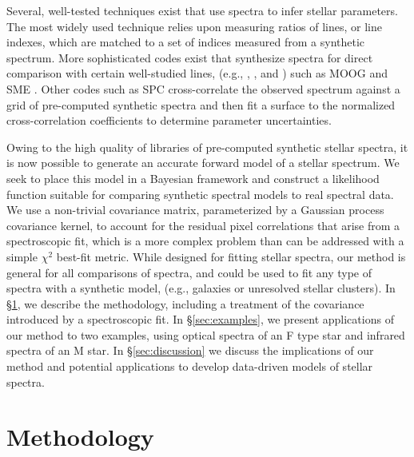 \documentclass[iop,floatfix]{emulateapj}
\begin{document}
Several, well-tested techniques exist that use spectra to infer stellar parameters. The most widely used technique relies upon measuring ratios of lines, or line indexes, which are matched to a set of indices measured from a synthetic spectrum. More sophisticated codes exist that synthesize spectra for direct comparison with certain well-studied lines, (e.g., , , and ) such as MOOG \citep{sneden73} and SME \citep{valenti96}. Other codes such as SPC \citep{buchhave12} cross-correlate the observed spectrum against a grid of pre-computed synthetic spectra and then fit a surface to the normalized cross-correlation coefficients to determine parameter uncertainties. 

Owing to the high quality of libraries of pre-computed synthetic stellar spectra, it is now possible to generate an accurate forward model of a stellar spectrum. We seek to place this model in a Bayesian framework and construct a likelihood function suitable for comparing synthetic spectral models to real spectral data. We use a non-trivial covariance matrix, parameterized by a Gaussian process covariance kernel, to account for the residual pixel correlations that arise from a spectroscopic fit, which is a more complex problem than can be addressed with a simple $\chi^2$ best-fit metric. While designed for fitting stellar spectra, our method is general for all comparisons of spectra, and could be used to fit any type of spectra with a synthetic model, (e.g., galaxies or unresolved stellar clusters). In \S\ref{sec:method}, we describe the methodology, including a treatment of the covariance introduced by a spectroscopic fit. In \S\ref{sec:examples}, we present applications of our method to two examples, using optical spectra of an F type star and infrared spectra of an M star. In \S\ref{sec:discussion} we discuss the implications of our method and potential applications to develop data-driven models of stellar spectra.

\section{Methodology} \label{sec:method}
\end{document}
